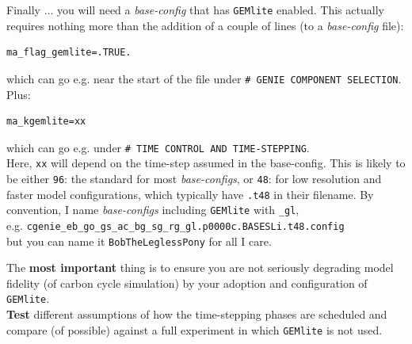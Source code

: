 \documentclass[11pt,fleqn]{book} %
\begin{document}
Finally ... you will need a \textit{base-config} that has \texttt{GEMlite} enabled.
This actually requires nothing more than the addition of a couple of lines (to a \textit{base-config} file): 
\vspace{-1mm}\begin{verbatim}
ma_flag_gemlite=.TRUE.
\end{verbatim}\vspace{-1mm}
which can go e.g. near the start of the file under \texttt{\# GENIE COMPONENT SELECTION}.
Plus:
\vspace{-1mm}\begin{verbatim}
ma_kgemlite=xx
\end{verbatim}\vspace{-1mm}
which can go e.g. under \texttt{\# TIME CONTROL AND TIME-STEPPING}.
\\Here, \texttt{xx} will depend on the time-step assumed in the base-config. This is likely to be either \texttt{96}: the standard for most \textit{base-configs}, or \texttt{48}: for low resolution and faster model configurations, which typically have \texttt{.t48} in their filename.
By convention, I name \textit{base-configs} including \texttt{GEMlite} with \texttt{\_gl},
\\e.g. \texttt{cgenie\_eb\_go\_gs\_ac\_bg\_sg\_rg\_gl.p0000c.BASESLi.t48.config}
\\but you can name it \texttt{BobTheLeglessPony} for all I care.

The \textbf{most important} thing is to ensure you are not seriously degrading model fidelity (of carbon cycle simulation) by your adoption and configuration of \texttt{GEMlite}.
\\\textbf{Test} different assumptions of how the time-stepping phases are scheduled and compare (of possible) against a full experiment in which \texttt{GEMlite} is not used.
\end{document}
